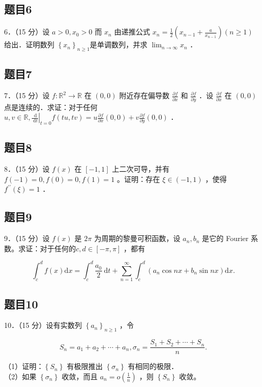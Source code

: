 \documentclass{article}
\begin{document}
\subsection{题目6}
6．（15 分）设 \(a>0, x_{0}>0\) 而 \(x_{n}\) 由递推公式 \(x_{n}=\frac{1}{2}\left(x_{n-1}+\frac{a}{x_{n-1}}\right)(n \geq 1)\) 给出．证明数列 \(\left\{x_{n}\right\}_{n \geq 1}\)是单调数列，并求 \(\lim _{n \rightarrow \infty} x_{n}\) ．

\subsection{题目7}
7．（15 分）设 \(f: \mathbb{R}^{2} \rightarrow \mathbb{R}\) 在 \((0,0)\) 附近存在偏导数 \(\frac{\partial f}{\partial x}\) 和 \(\frac{\partial f}{\partial y}\) ．设 \(\frac{\partial f}{\partial x}\) 在 \((0,0)\) 点是连续的．求证：对于任何 \(u, v \in \mathbb{R},\left.\frac{\mathrm{~d}}{\mathrm{~d} t}\right|_{t=0} f(t u, t v)=u \frac{\partial f}{\partial x}(0,0)+v \frac{\partial f}{\partial y}(0,0)\) ．

\subsection{题目8}
8．（15 分）设 \(f(x)\) 在 \([-1,1]\) 上二次可导，并有 \(f(-1)=0, f(0)=0, f(1)=1\) 。证明：存在 \(\xi \in(-1,1)\) ，使得 \(f^{\prime \prime}(\xi)=1\) ．

\subsection{题目9}
9．（15 分）设 \(f(x)\) 是 \(2 \pi\) 为周期的黎曼可积函数，设 \(a_{n}, b_{n}\) 是它的 Fourier 系数。求证：对于任何的\(c, d \in[-\pi, \pi]\) ，都有

\[
\int_{c}^{d} f(x) \mathrm{d} x=\int_{c}^{d} \frac{a_{0}}{2} \mathrm{~d} t+\sum_{n=1}^{\infty} \int_{c}^{d}\left(a_{n} \cos n x+b_{n} \sin n x\right) \mathrm{d} x .
\]

\subsection{题目10}
10．（15 分）设有实数列 \(\left\{a_{n}\right\}_{n \geq 1}\) ，令

\[
S_{n}=a_{1}+a_{2}+\cdots+a_{n}, \sigma_{n}=\frac{S_{1}+S_{2}+\cdots+S_{n}}{n} .
\]

（1）证明：\(\left\{S_{n}\right\}\) 有极限推出 \(\left\{\sigma_{n}\right\}\) 有相同的极限．\\
（2）如果 \(\left\{\sigma_{n}\right\}\) 收敛，而且 \(a_{n}=o\left(\frac{1}{n}\right)\) ，则 \(\left\{S_{n}\right\}\) 收敛。
\end{document}
